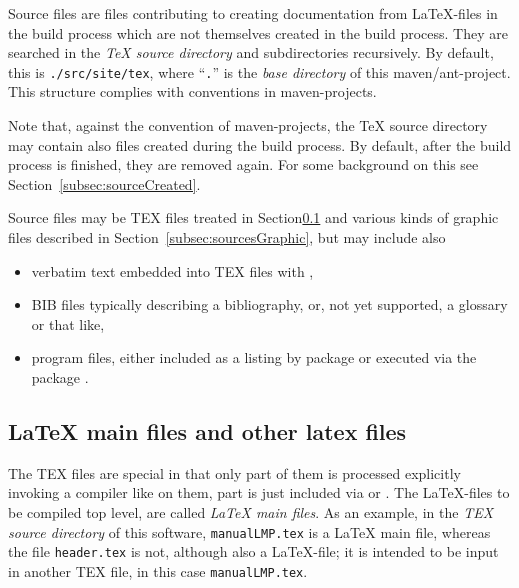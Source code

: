 Source files are files contributing to creating documentation 
from \LaTeX-files in the build process 
which are not themselves created in the build process. 
They are searched in the \emph{\TeX{} source directory} and subdirectories recursively. 
By default, this is \texttt{./src/site/tex}, 
where ``\texttt{.}'' is the \emph{base directory} of this maven/ant-project. 
This structure complies with conventions in maven-projects. 

Note that, against the convention of maven-projects, 
the \TeX{} source directory may contain also files created during the build process. 
By default, after the build process is finished, they are removed again. 
For some background on this see Section~\ref{subsec:sourceCreated}. 

Source files may be TEX files treated in Section\ref{subsec:sourcesLatex} 
and various kinds of graphic files described in Section~\ref{subsec:sourcesGraphic}, 
but may include also 
%
\begin{itemize}
\item 
verbatim text embedded into TEX files with , 
\item 
BIB files typically describing a bibliography,  or, %
not yet supported, a glossary or that like, %
\item 
program files, either included as a listing by package  
or executed via the package . %
\end{itemize}


\subsection{\LaTeX{} main files and other latex files}\label{subsec:sourcesLatex}

The TEX files are special in that only part of them is processed explicitly 
invoking a compiler like \lualatex{} on them, 
part is just included via  or . 
The \LaTeX-files to be compiled top level, 
are called \emph{\LaTeX{} main files}. 
As an example, 
in the \emph{TEX source directory} of this software, 
\texttt{manualLMP.tex} is a \LaTeX{} main file, 
whereas the file \texttt{header.tex} is not, although also a \LaTeX-file; 
it is intended to be input in another TEX file, in this case \texttt{manualLMP.tex}. 



